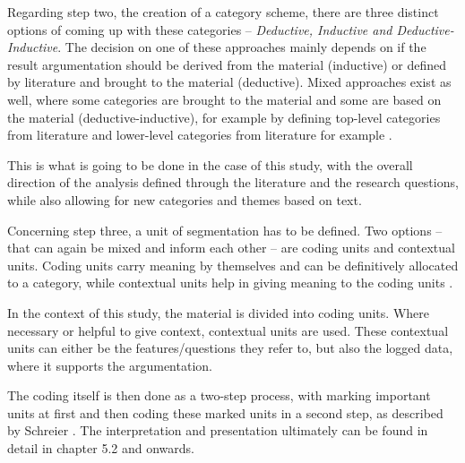 Regarding step two, the creation of a category scheme, there are three distinct options of coming up with these categories -- \textit{Deductive, Inductive and Deductive-Inductive}. The decision on one of these approaches mainly depends on if the result argumentation should be derived from the material (inductive) or defined by literature and brought to the material (deductive). Mixed approaches exist as well, where some categories are brought to the material and some are based on the material (deductive-inductive), for example by defining top-level categories from literature and lower-level categories from literature for example \cite{schreier2014ways}.

This is what is going to be done in the case of this study, with the overall direction of the analysis defined through the literature and the research questions, while also allowing for new categories and themes based on text.

Concerning step three, a unit of segmentation has to be defined. Two options -- that can again be mixed and inform each other -- are coding units and contextual units. Coding units carry meaning by themselves and can be definitively allocated to a category, while contextual units help in giving meaning to the coding units \cite{schreier2014ways}.

In the context of this study, the material is divided into coding units. Where necessary or helpful to give context, contextual units are used. These contextual units can either be the features/questions they refer to, but also the logged data, where it supports the argumentation.

The coding itself is then done as a two-step process, with marking important units at first and then coding these marked units in a second step, as described by Schreier \cite{schreier2014ways}. The interpretation and presentation ultimately can be found in detail in chapter 5.2 and onwards.